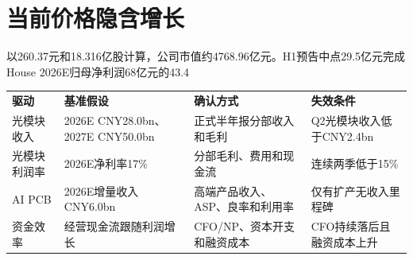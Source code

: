 \section{当前价格隐含增长}
以260.37元和18.316亿股计算，公司市值约4768.96亿元。H1预告中点29.5亿元完成House 2026E归母净利润68亿元的43.4%

\begin{exhibitbox}
\begin{tabularx}{\exhibitboxwidth}{L{3.0cm}X L{3.0cm}X}
\textbf{驱动} & \textbf{基准假设} & \textbf{确认方式} & \textbf{失效条件} \\
光模块收入 & 2026E CNY28.0bn、2027E CNY50.0bn & 正式半年报分部收入和毛利 & Q2光模块收入低于CNY2.4bn \\
光模块利润率 & 2026E净利率17\% & 分部毛利、费用和现金流 & 连续两季低于15\% \\
AI PCB & 2026E增量收入CNY6.0bn & 高端产品收入、ASP、良率和利用率 & 仅有扩产无收入里程碑 \\
资金效率 & 经营现金流跟随利润增长 & CFO/NP、资本开支和融资成本 & CFO持续落后且融资成本上升 \\
\end{tabularx}
\end{exhibitbox}
